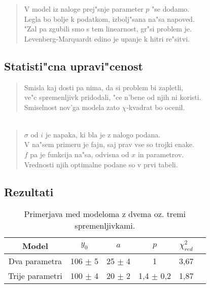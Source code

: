\documentclass[a4paper,10pt]{article}
\begin{document}
\begin{verse}
V model iz naloge prej"snje parameter $p$ "se dodamo. \\ 
Legla bo bolje k podatkom, izbolj"sana na"sa napoved. \\
"Zal pa zgubili smo s tem linearnost, gr"si problem je. \\
Levenberg-Marquardt edino je upanje k hitri re"sitvi.
\end{verse}

\subsection{Statisti"cna upravi"cenost}
\begin{verse}
 Smisla kaj dosti pa nima, da si problem bi zapletli, \\
 ve"c spremenljivk pridodali, "ce n'bene od njih ni koristi. \\
 Smiselnost nov'ga modela zato $\chi$-kvadrat bo ocenil. 
\end{verse}

\begin{align}
\end{align}

\begin{verse}
 $\sigma$ od $i$ je napaka, ki bla je z nalogo podana. \\
 V na"sem primeru je fajn, saj prav vse so trojki enake. \\
 $f$ pa je funkcija na"sa, odvisna od $x$ in parametrov. \\
 Vrednosti njih optimalne podane so v prvi tabeli. \\ 
\end{verse}


\subsection{Rezultati}

\begin{table}[h]
 \centering
\begin{tabular}{|c|c|c|c|c|c|}
 \hline
  Model & $y_0$ & $a$ & $p$ & $\chi^2_{red}$ \\
\hline
  Dva parametra & 106 $\pm$ 5 & 25 $\pm$ 4 & 1 & 3,67 \\
\hline
  Trije parametri & 100 $\pm$ 4 & 20 $\pm$ 2 & 1,4 $\pm$ 0,2 & 1,87 \\
\hline
\end{tabular}
\caption{Primerjava med modeloma z dvema oz. tremi spremenljivkami. }
\label{tab:farmacija}
\end{table}
\end{document}
